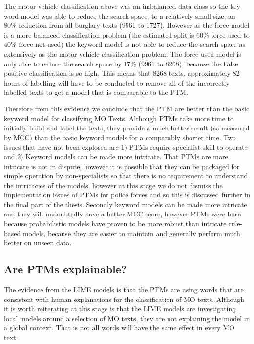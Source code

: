 The motor vehicle classification above  was an imbalanced data class so the key word model was able to reduce the search space, to a relatively small size, an 80\% reduction from all burglary texts (9961 to 1727). However as the force model is a more balanced classification problem (the estimated split is 60\% force used to 40\% force not used) the keyword model is not able to reduce the search space as extensively as the motor vehicle classification problem. The force-used model is only able to reduce the search space by 17\% (9961 to 8268), because the False positive classification is so high. This means that 8268 texts, approximately 82 hours of labelling will have to be conducted to remove all of the incorrectly labelled texts to get a model that is comparable to the PTM.

Therefore from this evidence we conclude that the PTM are better than the basic keyword model for classifying MO Texts. Although PTMs take more time to initially build and label the texts, they provide a much better result (as measured by MCC) than the basic keyword models for a comparably shorter time. Two issues that have not been explored are 1) PTMs require specialist skill to operate and 2) Keyword models can be made more intricate. That PTMs are more intricate is not in dispute, however it is possible that they can be packaged for simple operation by non-specialists so that there is no requirement to understand the intricacies of the models, however at this stage we do not dismiss the implementation issues of PTMs for police forces and so this is discussed further in the final part of the thesis. Secondly keyword models can be made more intricate and they will undoubtedly have a better MCC score, however PTMs were born because probabilistic models have proven to be more robust than intricate rule-based models, because they are easier to maintain and generally perform much better on unseen data.        

\subsection{Are PTMs explainable?} The evidence from the LIME models is that the PTMs are using words that are consistent with human explanations for the classification of MO texts. Although it is worth reiterating at this stage is that the LIME models are investigating local models around a selection of MO texts, they are not explaining the model in a global context. That is not all words will have the same effect in every MO text. 

